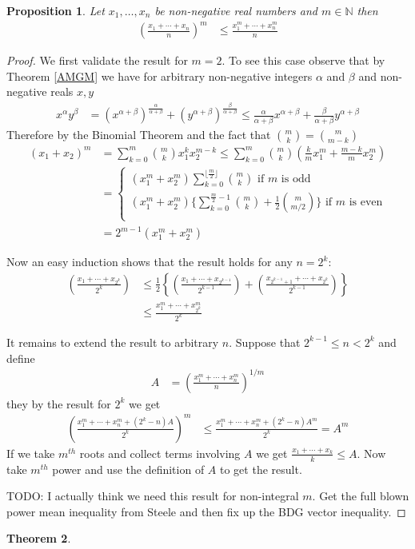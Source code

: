 \documentclass{amsbook}
\newtheorem{thm}{Theorem}[chapter]
\newtheorem{prop}[thm]{Proposition}
\theoremstyle{definition}
\theoremstyle{remark}
\newcommand{\naturals}{\mathbb{N}}
\newcommand{\floor}[1]{\lfloor #1 \rfloor}
\begin{document}
\begin{prop}\label{SimplePowerMean}Let $x_1, \dotsc, x_n$ be non-negative real numbers and $m
  \in \naturals$ then 
\begin{align*}
\left( \frac{x_1 + \dotsm + x_n}{n} \right)^m &\leq \frac{x^m_1 + \dotsm + x^m_n}{n}
\end{align*}
\end{prop}
\begin{proof}
We first validate the result for $m=2$.  To see this case observe that
by Theorem \ref{AMGM} we have for arbitrary non-negative integers
$\alpha$ and $\beta$ and non-negative reals $x,y$
\begin{align*}
x^\alpha y^\beta &= 
(x^{\alpha+\beta})^{\frac{\alpha}{\alpha + \beta}}
+ (y^{\alpha+\beta})^{\frac{\beta}{\alpha + \beta}}
\leq \frac{\alpha}{\alpha + \beta} x^{\alpha+\beta} + 
\frac{\beta}{\alpha + \beta} y^{\alpha+\beta}
\end{align*}
Therefore by the Binomial Theorem and the fact that $\binom{m}{k} = \binom{m}{m-k}$
\begin{align*}
(x_1 + x_2)^m &= \sum_{k=0}^m \binom{m}{k} x_1^k x_2^{m-k}
\leq \sum_{k=0}^m \binom{m}{k} \left(\frac{k}{m} x_1^m + \frac{m-k}{m} x_2^m \right) \\
&= \begin{cases}
\left(x_1^m + x_2^m \right) \sum_{k=0}^{\floor{\frac{m}{2}}} \binom{m}{k} \text{ if $m$ is odd}\\
\left(x_1^m + x_2^m \right) \lbrace\sum_{k=0}^{\frac{m}{2} -1} \binom{m}{k} + \frac{1}{2}\binom{m}{m/2} \rbrace \text{ if $m$ is even}\\
\end{cases} \\
&= 2^{m-1} \left(x_1^m + x_2^m \right)
\end{align*}

Now an easy induction shows that the result holds for any $n=2^k$:
\begin{align*}
\left( \frac{x_1 + \dotsm + x_{2^k}}{2^k} \right)
&\leq
\frac{1}{2} \left \lbrace \left(\frac{x_1 + \dotsm + x_{2^{k-1}}}{2^{k-1}} \right) +
\left(\frac{x_{2^{k-1} + 1} + \dotsm + x_{2^{k}}}{2^{k-1}} \right) \right \rbrace \\
&\leq \frac{x_1^m + \dotsm + x_{2^k}^m}{2^k}
\end{align*}

It remains to extend the result to arbitrary $n$.  Suppose that $2^{k-1} \leq n < 2^k$ and 
define 
\begin{align*}
A &= \left ( \frac{x_1^m + \dotsm + x_n^m}{n} \right)^{1/m}
\end{align*}
they by the result for $2^k$ we get
\begin{align*}
\left( \frac{x_1^m + \dotsm + x_n^m + (2^k - n)A}{2^k} \right)^m 
&\leq
\frac{x_1^m + \dotsm + x_n^m +  (2^k - n)A^m}{2^k} = A^m
\end{align*}
If we take $m^{th}$ roots and collect terms involving $A$ we get $\frac{x_1 + \dotsm + x_k}{k} \leq A$.
Now take $m^{th}$ power and use the definition of $A$ to get the
result.

TODO: I actually think we need this result for non-integral $m$.  Get
the full blown power mean inequality from Steele and then fix up the
BDG vector inequality.
\end{proof}

\begin{thm}\label{StirlingsFormula}
\end{thm}
\end{document}
